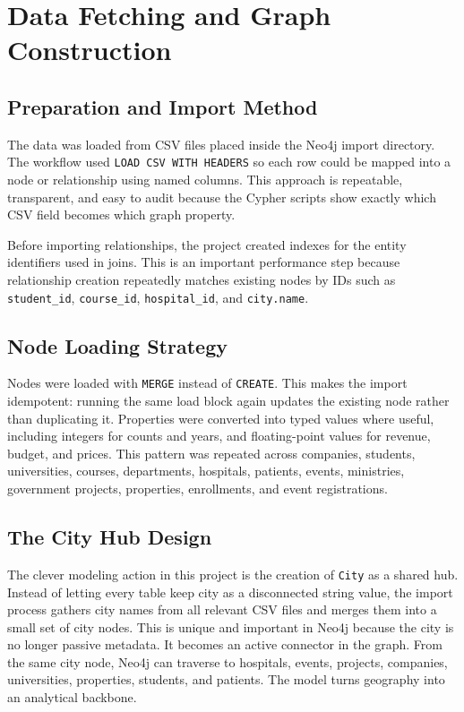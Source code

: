 ﻿\documentclass[11pt,a4paper]{article}
\begin{document}
\section{Data Fetching and Graph Construction}

\subsection{Preparation and Import Method}

The data was loaded from CSV files placed inside the Neo4j import directory. The workflow used \texttt{LOAD CSV WITH HEADERS} so each row could be mapped into a node or relationship using named columns. This approach is repeatable, transparent, and easy to audit because the Cypher scripts show exactly which CSV field becomes which graph property.

Before importing relationships, the project created indexes for the entity identifiers used in joins. This is an important performance step because relationship creation repeatedly matches existing nodes by IDs such as \texttt{student\_id}, \texttt{course\_id}, \texttt{hospital\_id}, and \texttt{city.name}.
\subsection{Node Loading Strategy}

Nodes were loaded with \texttt{MERGE} instead of \texttt{CREATE}. This makes the import idempotent: running the same load block again updates the existing node rather than duplicating it. Properties were converted into typed values where useful, including integers for counts and years, and floating-point values for revenue, budget, and prices.
This pattern was repeated across companies, students, universities, courses, departments, hospitals, patients, events, ministries, government projects, properties, enrollments, and event registrations.

\subsection{The City Hub Design}

The clever modeling action in this project is the creation of \texttt{City} as a shared hub. Instead of letting every table keep city as a disconnected string value, the import process gathers city names from all relevant CSV files and merges them into a small set of city nodes.
This is unique and important in Neo4j because the city is no longer passive metadata. It becomes an active connector in the graph. From the same city node, Neo4j can traverse to hospitals, events, projects, companies, universities, properties, students, and patients. The model turns geography into an analytical backbone.
\end{document}
